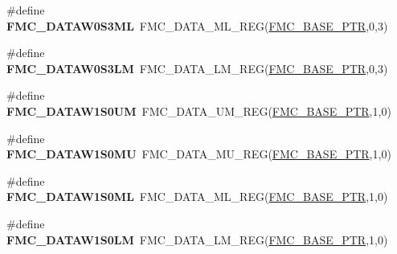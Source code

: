 \begin{DoxyCompactItemize}
\item 
\hypertarget{group___f_m_c___register___accessor___macros_gaee48f1cd3617233379c2ac573d1d80c3}{}\#define {\bfseries F\+M\+C\+\_\+\+D\+A\+T\+A\+W0\+S3\+M\+L}~F\+M\+C\+\_\+\+D\+A\+T\+A\+\_\+\+M\+L\+\_\+\+R\+E\+G(\hyperlink{group___f_m_c___peripheral_ga0a740437b573e32e6b932bf729485fd9}{F\+M\+C\+\_\+\+B\+A\+S\+E\+\_\+\+P\+T\+R},0,3)\label{group___f_m_c___register___accessor___macros_gaee48f1cd3617233379c2ac573d1d80c3}

\item 
\hypertarget{group___f_m_c___register___accessor___macros_ga4c54d49f847685ee4fe2e81a82f7af72}{}\#define {\bfseries F\+M\+C\+\_\+\+D\+A\+T\+A\+W0\+S3\+L\+M}~F\+M\+C\+\_\+\+D\+A\+T\+A\+\_\+\+L\+M\+\_\+\+R\+E\+G(\hyperlink{group___f_m_c___peripheral_ga0a740437b573e32e6b932bf729485fd9}{F\+M\+C\+\_\+\+B\+A\+S\+E\+\_\+\+P\+T\+R},0,3)\label{group___f_m_c___register___accessor___macros_ga4c54d49f847685ee4fe2e81a82f7af72}

\item 
\hypertarget{group___f_m_c___register___accessor___macros_ga71451e7e5990c0e3e37e9fe5215c7358}{}\#define {\bfseries F\+M\+C\+\_\+\+D\+A\+T\+A\+W1\+S0\+U\+M}~F\+M\+C\+\_\+\+D\+A\+T\+A\+\_\+\+U\+M\+\_\+\+R\+E\+G(\hyperlink{group___f_m_c___peripheral_ga0a740437b573e32e6b932bf729485fd9}{F\+M\+C\+\_\+\+B\+A\+S\+E\+\_\+\+P\+T\+R},1,0)\label{group___f_m_c___register___accessor___macros_ga71451e7e5990c0e3e37e9fe5215c7358}

\item 
\hypertarget{group___f_m_c___register___accessor___macros_gabafcd8e1b05e1cfb5cdf6c86c668183a}{}\#define {\bfseries F\+M\+C\+\_\+\+D\+A\+T\+A\+W1\+S0\+M\+U}~F\+M\+C\+\_\+\+D\+A\+T\+A\+\_\+\+M\+U\+\_\+\+R\+E\+G(\hyperlink{group___f_m_c___peripheral_ga0a740437b573e32e6b932bf729485fd9}{F\+M\+C\+\_\+\+B\+A\+S\+E\+\_\+\+P\+T\+R},1,0)\label{group___f_m_c___register___accessor___macros_gabafcd8e1b05e1cfb5cdf6c86c668183a}

\item 
\hypertarget{group___f_m_c___register___accessor___macros_gae6f0f8e577ae1703222f8e4c43cbc7ed}{}\#define {\bfseries F\+M\+C\+\_\+\+D\+A\+T\+A\+W1\+S0\+M\+L}~F\+M\+C\+\_\+\+D\+A\+T\+A\+\_\+\+M\+L\+\_\+\+R\+E\+G(\hyperlink{group___f_m_c___peripheral_ga0a740437b573e32e6b932bf729485fd9}{F\+M\+C\+\_\+\+B\+A\+S\+E\+\_\+\+P\+T\+R},1,0)\label{group___f_m_c___register___accessor___macros_gae6f0f8e577ae1703222f8e4c43cbc7ed}

\item 
\hypertarget{group___f_m_c___register___accessor___macros_ga977a3bff328a6125c36f43e4982626a0}{}\#define {\bfseries F\+M\+C\+\_\+\+D\+A\+T\+A\+W1\+S0\+L\+M}~F\+M\+C\+\_\+\+D\+A\+T\+A\+\_\+\+L\+M\+\_\+\+R\+E\+G(\hyperlink{group___f_m_c___peripheral_ga0a740437b573e32e6b932bf729485fd9}{F\+M\+C\+\_\+\+B\+A\+S\+E\+\_\+\+P\+T\+R},1,0)\label{group___f_m_c___register___accessor___macros_ga977a3bff328a6125c36f43e4982626a0}


\end{DoxyCompactItemize}
